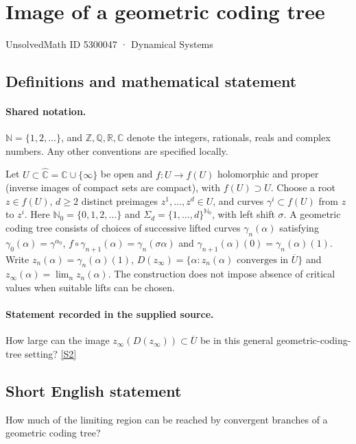 \documentclass[11pt]{article}
\newcommand{\sref}[2]{\hyperlink{source:#1:#2}{[S#2]}}
\begin{document}
\setcounter{section}{5300046}
\section{Image of a geometric coding tree}\label{5300047}
{\small\sffamily UnsolvedMath ID 5300047 · Dynamical Systems}
\subsection{Definitions and mathematical statement}

\paragraph{Shared notation.}$\mathbb N=\{1,2,\ldots\}$, and $\mathbb Z,\mathbb Q,\mathbb R,\mathbb C$ denote the integers, rationals, reals and complex numbers. Any other conventions are specified locally.


Let $U\subset\widehat{\mathbb C}=\mathbb C\cup\{\infty\}$ be open and $f:U\to f(U)$ holomorphic and proper (inverse images of compact sets are compact), with $f(U)\supset U$. Choose a root $z\in f(U)$, $d\geq2$ distinct preimages $z^1,\ldots,z^d\in U$, and curves $\gamma^i\subset f(U)$ from $z$ to $z^i$. Here $\mathbb N_0=\{0,1,2,\ldots\}$ and $\Sigma_d=\{1,\ldots,d\}^{\mathbb N_0}$, with left shift $\sigma$. A geometric coding tree consists of choices of successive lifted curves $\gamma_n(\alpha)$ satisfying $\gamma_0(\alpha)=\gamma^{\alpha_0}$, $f\circ\gamma_{n+1}(\alpha)=\gamma_n(\sigma\alpha)$ and $\gamma_{n+1}(\alpha)(0)=\gamma_n(\alpha)(1)$. Write $z_n(\alpha)=\gamma_n(\alpha)(1)$, $D(z_\infty)=\{\alpha:z_n(\alpha)\text{ converges in }\overline U\}$ and $z_\infty(\alpha)=\lim_n z_n(\alpha)$. The construction does not impose absence of critical values when suitable lifts can be chosen.
\paragraph{Statement recorded in the supplied source.}
How large can the image $z_\infty(D(z_\infty))\subset\overline U$ be in this general geometric-coding-tree setting? \sref{5300047}{2}
\subsection{Short English statement}
How much of the limiting region can be reached by convergent branches of a geometric coding tree?
\end{document}
